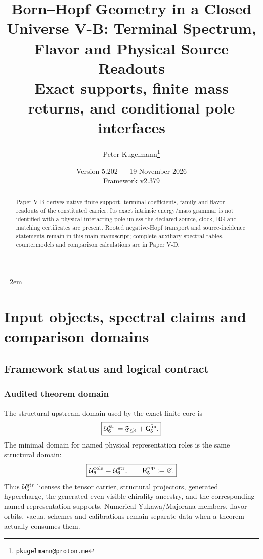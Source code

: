 \documentclass[12pt,a4paper]{article}
\title{\textbf{Born--Hopf Geometry in a Closed Universe V-B: Terminal Spectrum, Flavor and Physical Source Readouts}\\[0.45em]
\large Exact supports, finite mass returns, and conditional pole interfaces}
\author{Peter Kugelmann\thanks{\texttt{pkugelmann@proton.me}}}
\date{Version 5.202 --- 19 November 2026 \\ Framework v2.379}
\newcommand{\Gfive}{\mathsf G_5^{\rm fin}}
\newcommand{\Rrep}{\mathsf R_5^{\rm rep}}
\newcommand{\Ubase}{\mathcal U_6^{\rm str}}
\newcommand{\Urole}{\mathcal U_6^{\rm role}}
\begin{document}
\emergencystretch=2em
\maketitle
\begin{abstract}
Paper V-B derives native finite support, terminal coefficients,
family and flavor readouts of the constituted carrier. Its exact intrinsic
energy/mass grammar is not identified with a physical interacting pole unless
the declared source, clock, RG and matching certificates are present.
Rooted negative-Hopf transport and source-incidence statements remain in this
main manuscript; complete auxiliary spectral tables, countermodels and
comparison calculations are in Paper V-D.
\end{abstract}
\begingroup
\makeatletter
\renewcommand*\l@section[2]{\@dottedtocline{1}{1.5em}{3.0em}{#1}{#2}}
\renewcommand*\l@subsection[2]{\@dottedtocline{2}{4.5em}{3.9em}{#1}{#2}}
\renewcommand*\l@subsubsection[2]{\@dottedtocline{3}{8.4em}{4.7em}{#1}{#2}}
\makeatother
\tableofcontents
\endgroup
\clearpage

\section{Input objects, spectral claims and comparison domains}
\label{p5b:sec:organized-scope}
\subsection{Framework status and logical contract}
\label{p6:sec:framework-status}

\subsubsection{Audited theorem domain}

The structural upstream domain used by the exact finite core is
\begin{equation}
\label{p6:eq:audited-upstream-domain}
\boxed{
\Ubase
=
\mathfrak F_{\le4}
+\Gfive.
}
\end{equation}
The minimal domain for named physical representation roles is the same
structural domain:
\begin{equation}
\label{p6:eq:physical-role-upstream-domain}
\boxed{
\Urole=\Ubase,
\qquad
\Rrep:=\varnothing.
}
\end{equation}
Thus \(\Ubase\) licenses the tensor carrier, structural projectors, generated
hypercharge, the generated even visible-chirality ancestry, and the
corresponding named representation supports.  Numerical Yukawa/Majorana
members, flavor orbits, vacua, schemes and calibrations remain separate data
when a theorem actually consumes them.
\end{document}
